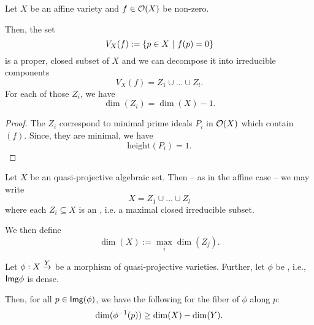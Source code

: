 \begin{lemma}
	Let $X$ be an affine variety and $f\in \mathcal{O}(X)$ be non-zero.
	
	Then, the set
	\[ V_X(f) := \left\lbrace p \in X ~ | ~ f(p) = 0\right\rbrace \]
	is a proper, closed subset of $X$ and we can decompose it into irreducible components
	\[ V_X(f) = Z_1\cup \ldots \cup Z_l. \]
	For each of those $Z_i$, we have
	\[ \dim(Z_i) = \dim(X) - 1. \]
\end{lemma}
\begin{proof}
	The $Z_i$ correspond to minimal prime ideals $P_i$ in $\mathcal{O}(X)$ which contain $(f)$. Since, they are minimal, we have
	\[ \mathrm{height}(P_i) = 1. \]
\end{proof}

\begin{lemma}
	Let $X$ be an quasi-projective algebraic set. Then -- as in the affine case -- we may write
	\[ X = Z_1\cup\ldots \cup Z_l \]
	where each $Z_i \subseteq X$ is an , i.e. a maximal closed irreducible subset.
	
	We then define
	\[ \dim(X) := \max_i \dim(Z_j). \]
\end{lemma}
\begin{lemma}
	Let $\phi :X \overset{Y}{\rightarrow}$ be a morphism of quasi-projective varieties. Further, let $\phi$ be , i.e., $\textsf{Img} \phi$ is dense.
	
	Then, for all $p \in \textsf{Img}(\phi)$, we have the following for the fiber of $\phi$ along $p$:
	\[ \dim(\phi^{-1}(p)) \geq \dim(X) - \dim(Y). \]
\end{lemma}